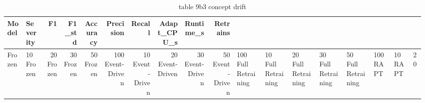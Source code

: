 \begin{table}
\caption{table 9b3 concept drift}
\label{tab:table_9b3_concept_drift}
\begin{tabular}{llrrrrrrrr}
\toprule
Model & Severity & F1 & F1_std & Accuracy & Precision & Recall & Adapt_CPU_s & Runtime_s & Retrains \\
\midrule
Frozen & 10%
Frozen & 20%
Frozen & 30%
Frozen & 50%
Frozen & 100%
Event-Driven & 10%
Event-Driven & 20%
Event-Driven & 30%
Event-Driven & 50%
Event-Driven & 100%
Full Retraining & 10%
Full Retraining & 20%
Full Retraining & 30%
Full Retraining & 50%
Full Retraining & 100%
RAPT & 10%
RAPT & 20%

\end{tabular}
\end{table}
